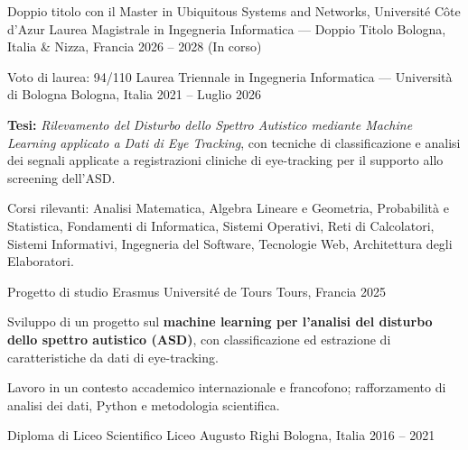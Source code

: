 \documentclass[11pt, a4paper]{../awesome-cv}
\begin{document}
\begin{cventries}
  \cventry
    {Doppio titolo con il Master in Ubiquitous Systems and Networks, Université Côte d'Azur}
    {Laurea Magistrale in Ingegneria Informatica — Doppio Titolo}
    {Bologna, Italia \& Nizza, Francia}
    {2026 -- 2028 (In corso)}
    {}

  \cventry
    {Voto di laurea: 94/110}
    {Laurea Triennale in Ingegneria Informatica — Università di Bologna}
    {Bologna, Italia}
    {2021 -- Luglio 2026}
    {
      \begin{cvitems}
        \item {\textbf{Tesi:} \textit{Rilevamento del Disturbo dello Spettro Autistico mediante Machine Learning applicato a Dati di Eye Tracking}, con tecniche di classificazione e analisi dei segnali applicate a registrazioni cliniche di eye-tracking per il supporto allo screening dell'ASD.}
        \item {Corsi rilevanti: Analisi Matematica, Algebra Lineare e Geometria, Probabilità e Statistica, Fondamenti di Informatica, Sistemi Operativi, Reti di Calcolatori, Sistemi Informativi, Ingegneria del Software, Tecnologie Web, Architettura degli Elaboratori.}
      \end{cvitems}
    }

  \cventry
    {Progetto di studio Erasmus}
    {Université de Tours}
    {Tours, Francia}
    {2025}
    {
      \begin{cvitems}
        \item {Sviluppo di un progetto sul \textbf{machine learning per l'analisi del disturbo dello spettro autistico (ASD)}, con classificazione ed estrazione di caratteristiche da dati di eye-tracking.}
        \item {Lavoro in un contesto accademico internazionale e francofono; rafforzamento di analisi dei dati, Python e metodologia scientifica.}
      \end{cvitems}
    }

  \cventry
    {Diploma di Liceo Scientifico}
    {Liceo Augusto Righi}
    {Bologna, Italia}
    {2016 -- 2021}
    {}
\end{cventries}
\end{document}
